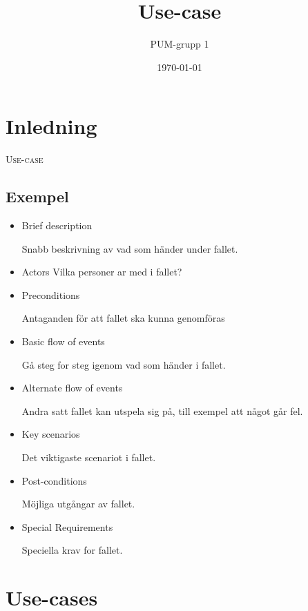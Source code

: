 

\ifpdf
\else
\fi

\title{Use-case}
\author{PUM-grupp 1}
\date{\today}



\maketitle\thispagestyle{empty}

\newpage

\section{Inledning}

\textsc{\LARGE Use-case}

\subsection{Exempel}
\begin{itemize}
	\item Brief description
	
	Snabb beskrivning av vad som händer under fallet.
	\item Actors
	Vilka personer ar med i fallet?
	
	\item Preconditions
	
	Antaganden för att fallet ska kunna genomföras
	\item Basic flow of events
	
	Gå steg for steg igenom vad som händer i fallet.
	\item Alternate flow of events
	
	Andra satt fallet kan utspela sig på, till exempel att något går fel.
	\item Key scenarios
	
	Det viktigaste scenariot i fallet.
	\item Post-conditions
	
	Möjliga utgångar av fallet.
	\item Special Requirements
	
	Speciella krav for fallet.
\end{itemize}

\section{Use-cases} 

